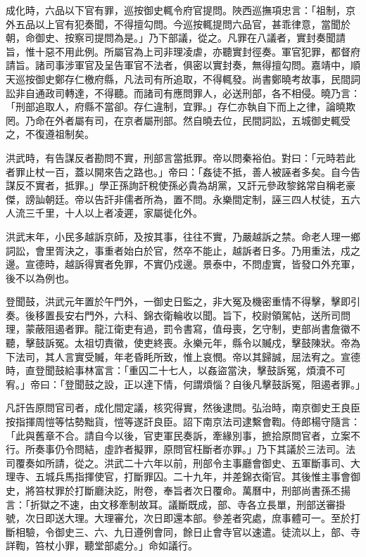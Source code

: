 成化時，六品以下官有罪，巡按御史輒令府官提問。陜西巡撫項忠言：「祖制，京外五品以上官有犯奏聞，不得擅勾問。今巡按輒提問六品官，甚乖律意，當聞於朝，命御史、按察司提問為是。」乃下部議，從之。凡罪在八議者，實封奏聞請旨，惟十惡不用此例。所屬官為上司非理凌虐，亦聽實封徑奏。軍官犯罪，都督府請旨。諸司事涉軍官及呈告軍官不法者，俱密以實封奏，無得擅勾問。嘉靖中，順天巡按御史鄭存仁檄府縣，凡法司有所追取，不得輒發。尚書鄭曉考故事，民間詞訟非自通政司轉達，不得聽。而諸司有應問罪人，必送刑部，各不相侵。曉乃言：「刑部追取人，府縣不當卻。存仁違制，宜罪。」存仁亦執自下而上之律，論曉欺罔。乃命在外者屬有司，在京者屬刑部。然自曉去位，民間詞訟，五城御史輒受之，不復遵祖制矣。

洪武時，有告謀反者勘問不實，刑部言當抵罪。帝以問秦裕伯。對曰：「元時若此者罪止杖一百，蓋以開來告之路也。」帝曰：「姦徒不抵，善人被誣者多矣。自今告謀反不實者，抵罪。」學正孫詢訐稅使孫必貴為胡黨，又訐元參政黎銘常自稱老豪傑，謗訕朝廷。帝以告訐非儒者所為，置不問。永樂間定制，誣三四人杖徒，五六人流三千里，十人以上者凌遲，家屬徙化外。

洪武末年，小民多越訴京師，及按其事，往往不實，乃嚴越訴之禁。命老人理一鄉詞訟，會里胥決之，事重者始白於官，然卒不能止，越訴者日多。乃用重法，戍之邊。宣德時，越訴得實者免罪，不實仍戍邊。景泰中，不問虛實，皆發口外充軍，後不以為例也。

登聞鼓，洪武元年置於午門外，一御史日監之，非大冤及機密重情不得擊，擊即引奏。後移置長安右門外，六科、錦衣衛輪收以聞。旨下，校尉領駕帖，送所司問理，蒙蔽阻遏者罪。龍江衛吏有過，罰令書寫，值母喪，乞守制，吏部尚書詹徽不聽，擊鼓訴冤。太祖切責徽，使吏終喪。永樂元年，縣令以贓戍，擊鼓陳狀。帝為下法司，其人言實受贓，年老昏眊所致，惟上哀憫。帝以其歸誠，屈法宥之。宣德時，直登聞鼓給事林富言：「重囚二十七人，以姦盜當決，擊鼓訴冤，煩瀆不可宥。」帝曰：「登聞鼓之設，正以達下情，何謂煩惱？自後凡擊鼓訴冤，阻遏者罪。」

凡訐告原問官司者，成化間定議，核究得實，然後逮問。弘治時，南京御史王良臣按指揮周愷等怙勢黜貨，愷等遂訐良臣。詔下南京法司逮繫會鞫。侍郎楊守隨言：「此與舊章不合。請自今以後，官吏軍民奏訴，牽緣別事，摭拾原問官者，立案不行。所奏事仍令問結，虛詐者擬罪，原問官枉斷者亦罪。」乃下其議於三法司。法司覆奏如所請，從之。洪武二十六年以前，刑部令主事廳會御史、五軍斷事司、大理寺、五城兵馬指揮使官，打斷罪囚。二十九年，并差錦衣衛官。其後惟主事會御史，將笞杖罪於打斷廳決訖，附卷，奉旨者次日覆命。萬曆中，刑部尚書孫丕揚言：「折獄之不速，由文移牽制故耳。議斷既成，部、寺各立長單，刑部送審掛號，次日即送大理。大理審允，次日即還本部。參差者究處，庶事體可一。至於打斷相驗，令御史三、六、九日遵例會同，餘日止會寺官以速遣。徒流以上，部、寺詳鞫，笞杖小罪，聽堂部處分。」命如議行。

